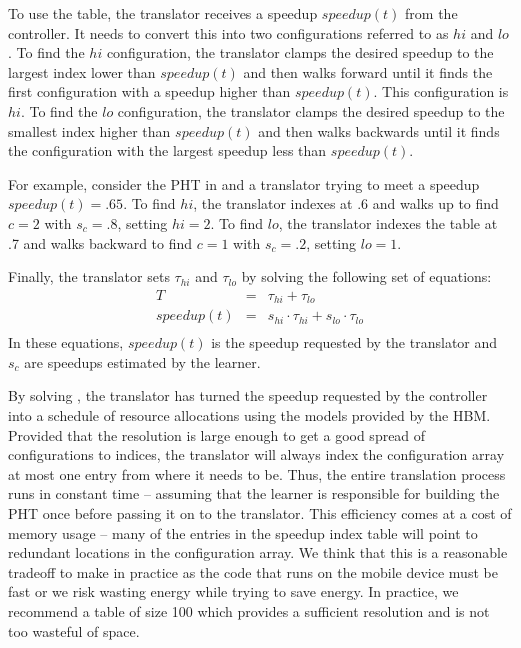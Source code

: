 To use the table, the translator receives a speedup $speedup(t)$ from the
controller.  It needs to convert this into two configurations referred
to as $hi$ and $lo$.  To find the $hi$ configuration, the translator
clamps the desired speedup to the largest index lower than $speedup(t)$ and
then walks forward until it finds the first configuration with a
speedup higher than $speedup(t)$.  This configuration is $hi$.  To find the
$lo$ configuration, the translator clamps the desired speedup to the
smallest index higher than $speedup(t)$ and then walks backwards until it
finds the configuration with the largest speedup less than $speedup(t)$.

For example, consider the PHT in  and a translator trying
to meet a speedup $speedup(t) = .65$.  To find $hi$, the translator indexes
at .6 and walks up to find $c=2$ with $s_c=.8$, setting $hi = 2$.  To
find $lo$, the translator indexes the table at .7 and walks backward
to find $c=1$ with $s_c=.2$, setting $lo = 1$.

Finally, the translator sets $\tau_{hi}$ and $\tau_{lo}$ by solving the
following set of equations:
\begin{eqnarray}
  T &=& \tau_{hi} + \tau_{lo}    \label{eqn:s1} \\
  speedup(t) &=& s_{hi} \cdot \tau_{hi} + s_{lo} \cdot \tau_{lo} \label{eqn:s2} \\
  \label{eq:pht}
\end{eqnarray}
In these equations, $speedup(t)$ is the speedup requested by the translator
and $s_c$ are speedups estimated by the learner. 

By solving , the translator has turned the speedup
requested by the controller into a schedule of resource allocations
using the models provided by the HBM.  Provided that the resolution is
large enough to get a good spread of configurations to indices, the
translator will always index the configuration array at most one entry
from where it needs to be.  Thus, the entire translation process runs
in constant time -- assuming that the learner is responsible for
building the PHT once before passing it on to the translator.  This
efficiency comes at a cost of memory usage -- many of the entries in
the speedup index table will point to redundant locations in the
configuration array.  We think that this is a reasonable tradeoff to
make in practice as the code that runs on the mobile device must be
fast or we risk wasting energy while trying to save energy.  In
practice, we recommend a table of size 100 which provides a sufficient
resolution and is not too wasteful of space.


